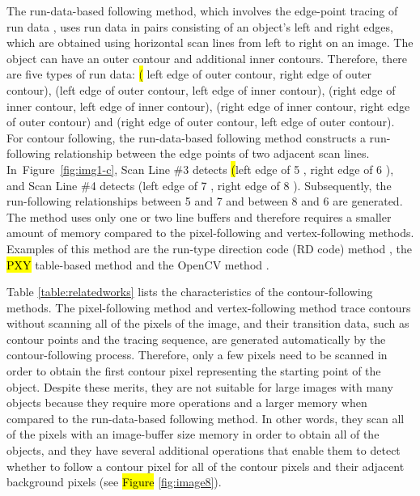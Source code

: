 \documentclass[sensors,article,accept,moreauthors,pdftex,10pt,a4paper]{mdpi}
\begin{document}
The run-data-based following method, which involves the edge-point tracing of run data \cite{Miyatake1997Contour,Shoji1999Contour}, uses run data in pairs consisting of an object's left and right edges, which are obtained using horizontal scan lines from left to right on an image. The object can have an outer contour and additional inner contours. Therefore, there are five types of run data: \hl{(}%
left edge of outer contour, right edge of outer contour), (left edge of outer contour, left edge of inner contour), (right edge of inner contour, left edge of inner contour), (right edge of inner contour, right edge of outer contour) and (right edge of outer contour, left edge of outer contour). For contour following, the run-data-based following method constructs a run-following relationship between the edge points of two adjacent scan lines. In~\mbox{Figure \ref{fig:img1-c}}, Scan Line \#3 detects \hl{(}left edge of 5%
, right edge of 6%
), and Scan Line \#4 detects (left edge of 7%
, right edge of 8%
). Subsequently, the run-following relationships between 5 and 7 and between 8 and 6 are generated. The method uses only one or two line buffers and therefore requires a smaller amount of memory compared to the pixel-following and vertex-following methods. Examples of this method are the run-type direction code (RD code) method \cite{Miyatake1997Contour}, the \hl{PXY}
 table-based method \cite{Shoji1999Contour} and the OpenCV method \cite{Suzuki1985Topological}. 

Table \ref{table:relatedworks} lists the characteristics of the contour-following methods. The pixel-following method and vertex-following method trace contours without scanning all of the pixels of the image, and their transition data, such as contour points and the tracing sequence, are generated automatically by the contour-following process. Therefore, only a few pixels need to be scanned in order to obtain the first contour pixel representing the starting point of the object. Despite these merits, they are not suitable for large images with many objects because they require more operations and a larger memory when compared to the run-data-based following method. In other words, they scan all of the pixels with an image-buffer size memory in order to obtain all of the objects, and they have several additional operations that enable them to detect whether to follow a contour pixel for all of the contour pixels and their adjacent background pixels (see \hl{Figure} \ref{fig:image8}). 
\end{document}
